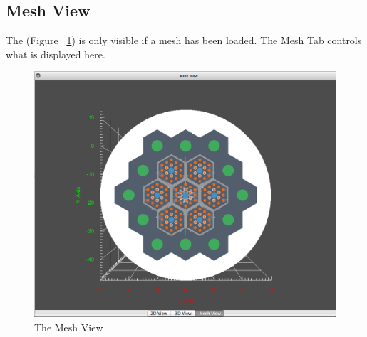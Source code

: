 \subsection{Mesh View}
The  (Figure ~\ref{fig:MeshView}) is only visible if a mesh has been loaded.  The Mesh Tab controls what is displayed here.

\begin{figure}[h]
	\begin{center}
		\includegraphics[width=0.5\linewidth]{Images/MeshView.png}
		\caption{The Mesh View}
		\label{fig:MeshView}
	\end{center}
\end{figure}

